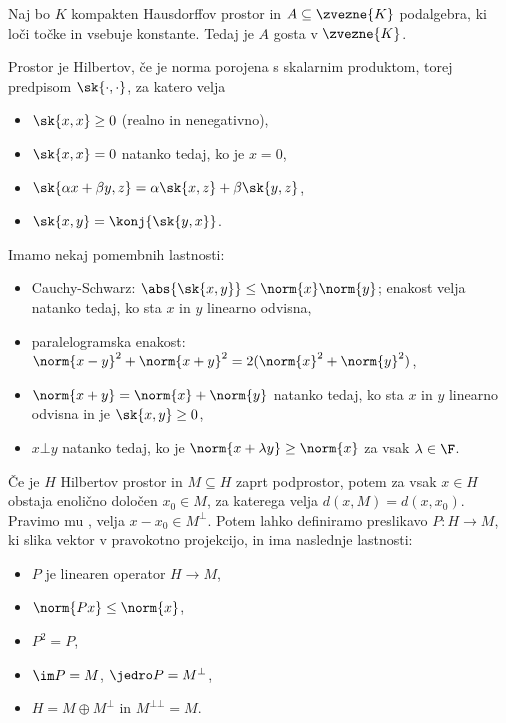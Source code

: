 \begin{izrek}
  Naj bo $K$ kompakten Hausdorffov prostor in $A \subseteq \zvezne{K}$
  podalgebra, ki loči točke in vsebuje konstante.
  Tedaj je $A$ gosta v $\zvezne{K}$.
\end{izrek}


Prostor je Hilbertov, če je norma porojena s skalarnim produktom, torej
predpisom $\sk{\cdot, \cdot}$, za katero velja
\begin{itemize}
\item $\sk{x,x} \ge 0$ (realno in nenegativno),
\item $\sk{x,x} = 0$ natanko tedaj, ko je $x = 0$,
\item $\sk{\alpha x + \beta y, z} = \alpha \sk{x,z} + \beta \sk{y,z}$,
\item $\sk{x,y} = \konj{\sk{y,x}}$.
\end{itemize}
Imamo nekaj pomembnih lastnosti:
\begin{itemize}
\item Cauchy-Schwarz: $\abs{\sk{x,y}} \le \norm{x} \norm{y}$;
  enakost velja natanko tedaj, ko sta $x$ in $y$ linearno odvisna,
\item paralelogramska enakost: $\norm{x-y}^2 + \norm{x+y}^2 = 2 (\norm{x}^2 +
  \norm{y}^2)$,
\item $\norm{x+y} = \norm{x} + \norm{y}$ natanko tedaj, ko sta $x$ in $y$
  linearno odvisna in je $\sk{x,y} \ge 0$,
\item $x \bot y$ natanko tedaj, ko je $\norm{x+\lambda y} \ge \norm{x}$ za vsak
  $\lambda \in \F$.
\end{itemize}

Če je $H$ Hilbertov prostor in $M \subseteq H$ zaprt podprostor, potem za vsak
$x \in H$ obstaja enolično določen $x_0 \in M$, za katerega velja $d(x,M) = d(x,
x_0)$.
Pravimo mu , velja $x - x_0 \in M^\bot$.
Potem lahko definiramo preslikavo $P: H \to M$, ki slika vektor v pravokotno
projekcijo, in ima naslednje lastnosti:
\begin{itemize}
\item $P$ je linearen operator $H \to M$,
\item $\norm{Px} \le \norm{x}$,
\item $P^2 = P$,
\item $\im P = M$, $\jedro P = M^\bot$,
\item $H = M \oplus M^\bot$ in $M^{\bot \bot} = M$.
\end{itemize}

